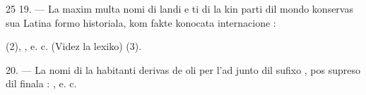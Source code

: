 \begin{VUpage}[29]{25}
\VUblanc{6.00pt}%
19. --- La maxim multa nomi di landi e ti di la kin\nl
parti dil mondo konservas sua Latina formo historiala, kom\nl
fakte konocata internacione :

 (2), \nl
{}\nl
{}\nl
{}, e. c. (Videz la lexiko) (3).

\VUblanc{5.98pt}%
20. --- La nomi di la habitanti derivas de oli per l'ad\cc
junto dil sufixo , pos supreso dil  finala : \nl
{}, e. c.
\end{VUpage}

